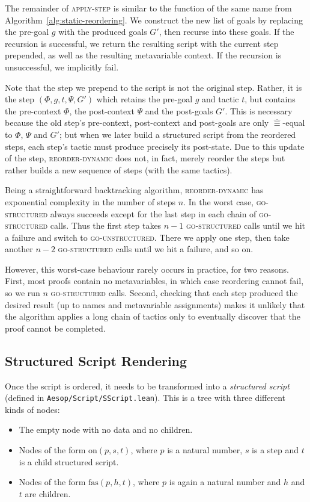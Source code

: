 \documentclass[sigplan,10pt,anonymous,review]{acmart}
\newcommand{\step}[5]{\ensuremath{(#1,\allowbreak #2,\allowbreak #3,\allowbreak #4,\allowbreak #5)}}
\newcommand{\aeq}{\mathrel{\hat{≡}}}
\begin{document}
The remainder of \textsc{apply-step} is similar to the function of the same name from Algorithm~\ref{alg:static-reordering}.
We construct the new list of goals by replacing the pre-goal $g$ with the produced goals $G'$, then recurse into these goals.
If the recursion is successful, we return the resulting script with the current step prepended, as well as the resulting metavariable context.
If the recursion is unsuccessful, we implicitly fail.

Note that the step we prepend to the script is not the original step.
Rather, it is the step $\step{Φ}{g}{t}{Ψ}{G'}$ which retains the pre-goal $g$ and tactic $t$, but contains the pre-context $Φ$, the post-context $Ψ$ and the post-goals $G'$.
This is necessary because the old step's pre-context, post-context and post-goals are only $\aeq$-equal to $Φ$, $Ψ$ and $G'$; but when we later build a structured script from the reordered steps, each step's tactic must produce precisely its post-state.
Due to this update of the step, \textsc{reorder-dynamic} does not, in fact, merely reorder the steps but rather builds a new sequence of steps (with the same tactics).

Being a straightforward backtracking algorithm, \textsc{reorder-dynamic} has exponential complexity in the number of steps $n$.
In the worst case, \textsc{go-structured} always succeeds except for the last step in each chain of \textsc{go-structured} calls.
Thus the first step takes $n-1$ \textsc{go-structured} calls until we hit a failure and switch to \textsc{go-unstructured}.
There we apply one step, then take another $n-2$ \textsc{go-structured} calls until we hit a failure, and so on.

However, this worst-case behaviour rarely occurs in practice, for two reasons.
First, most proofs contain no metavariables, in which case reordering cannot fail, so we run $n$ \textsc{go-structured} calls.
Second, checking that each step produced the desired result (up to names and metavariable assignments) makes it unlikely that the algorithm applies a long chain of tactics only to eventually discover that the proof cannot be completed.

\subsection{Structured Script Rendering}%
\label{sec:rendering}

Once the script is ordered, it needs to be transformed into a \emph{structured script} (defined in \texttt{Aesop/Script/SScript.lean}).
This is a tree with three different kinds of nodes:
\begin{itemize}
  \item The $\mathrm{empty}$ node with no data and no children.
  \item Nodes of the form $\mathrm{on}(p, s, t)$, where $p$ is a natural number, $s$ is a step and $t$ is a child structured script.
  \item Nodes of the form $\mathrm{fas}(p, h, t)$, where $p$ is again a natural number and $h$ and $t$ are children.
\end{itemize}
\end{document}
